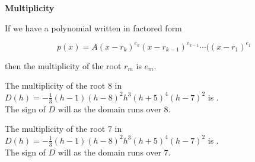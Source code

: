 \documentclass{ximera}
\author{Lee Wayand}
\begin{document}
\begin{exercise}






\begin{idea} \textbf{\textcolor{blue!55!black}{Multiplicity}}


If we have a polynomial written in factored form

\[
p(x) = A (x-r_k)^{e_k} (x-r_{k-1})^{e_{k-1}}  \cdots ((x-r_1)^{e_1}
\]

then the multiplicity of the root $r_m$ is $e_m$. \\





\end{idea}






\begin{question}



The multiplicity of the root $8$ in $D(h) = -\frac{1}{3} (h - 1) (h - 8)^2 h^3 (h + 5)^4 (h - 7)^2$ is . \\



The sign of $D$ will  as the domain runs over $8$.




\end{question}











\begin{question}



The multiplicity of the root $7$ in $D(h) = -\frac{1}{3} (h - 1) (h - 8)^2 h^3 (h + 5)^4 (h - 7)^2$ is . \\



The sign of $D$ will  as the domain runs over $7$.




\end{question}













\end{exercise}
\end{document}
